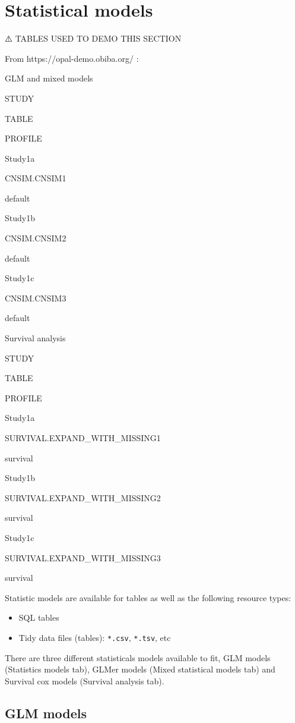 \documentclass[
]{book}
\providecommand{\tightlist}{%
  \setlength{\itemsep}{0pt}\setlength{\parskip}{0pt}}
\begin{document}
\hypertarget{statistical-models}{%
\section{Statistical models}\label{statistical-models}}

⚠️ TABLES USED TO DEMO THIS SECTION

From https://opal-demo.obiba.org/ :

GLM and mixed models

STUDY

TABLE

PROFILE

Study1a

CNSIM.CNSIM1

default

Study1b

CNSIM.CNSIM2

default

Study1c

CNSIM.CNSIM3

default

Survival analysis

STUDY

TABLE

PROFILE

Study1a

SURVIVAL.EXPAND\_WITH\_MISSING1

survival

Study1b

SURVIVAL.EXPAND\_WITH\_MISSING2

survival

Study1c

SURVIVAL.EXPAND\_WITH\_MISSING3

survival

Statistic models are available for tables as well as the following resource types:

\begin{itemize}
\tightlist
\item
  SQL tables
\item
  Tidy data files (tables): \texttt{*.csv}, \texttt{*.tsv}, etc
\end{itemize}

There are three different statisticals models available to fit, GLM models (Statistics models tab), GLMer models (Mixed statistical models tab) and Survival cox models (Survival analysis tab).

\hypertarget{glm-models}{%
\subsection{GLM models}\label{glm-models}}
\end{document}
